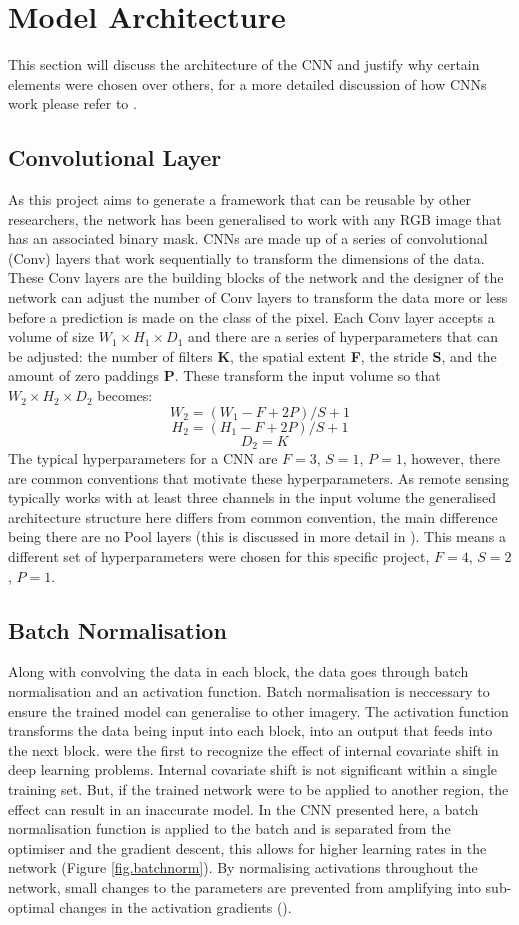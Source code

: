 \section{Model Architecture}\label{sec.model_architecture}
This section will discuss the architecture of the CNN and justify why certain elements were chosen over others, for a more detailed discussion of how CNNs work please refer to \cite{Richmond19b}.
\subsection{Convolutional Layer}
As this project aims to generate a framework that can be reusable by other researchers, the network has been generalised to work with any RGB image that has an associated binary mask. CNNs are made up of a series of convolutional (Conv) layers that work sequentially to transform the dimensions of the data. These Conv layers are the building blocks of the network and the designer of the network can adjust the number of Conv layers to transform the data more or less before a prediction is made on the class of the pixel. Each Conv layer accepts a volume of size\textbf{ $W_1\times H_1\times D_1$} and there are a series of hyperparameters that can be adjusted: the number of filters \textbf{K}, the spatial extent \textbf{F}, the stride \textbf{S}, and the amount of zero paddings \textbf{P}. These transform the input volume so that \textbf{$W_2\times H_2\times D_2$} becomes: 
\[\textbf{$W_2 = (W_1 - F + 2P)/S + 1$}\] \[\textbf{$H_2 = (H_1 - F + 2P)/S + 1$}\]\[\textbf{ $D_2 = K$}\]
The typical hyperparameters for a CNN are $F = 3$, $S = 1$, $P = 1$, however, there are common conventions that motivate these hyperparameters. As remote sensing typically works with at least three channels in the input volume the generalised architecture structure here differs from common convention, the main difference being there are no Pool layers (this is discussed in more detail in \citet{Richmond19b}). This means a different set of hyperparameters were chosen for this specific project, $F = 4$, $S = 2$, $P = 1$. 
\subsection{Batch Normalisation}
Along with convolving the data in each block, the data goes through batch normalisation and an activation function. Batch normalisation is neccessary to ensure the trained model can generalise to other imagery. The activation function transforms the data being input into each block, into an output that feeds into the next block. \citet{ioffe15} were the first to recognize the effect of internal covariate shift in deep learning problems. Internal covariate shift is not significant within a single training set. But, if the trained network were to be applied to another region, the effect can result in an inaccurate model. In the CNN presented here, a batch normalisation function is applied to the batch and is separated from the optimiser and the gradient descent, this allows for higher learning rates in the network (Figure \ref{fig.batchnorm}). By normalising activations throughout the network, small changes to the parameters are prevented from amplifying into sub-optimal changes in the activation gradients (\cite{ioffe15}). 

